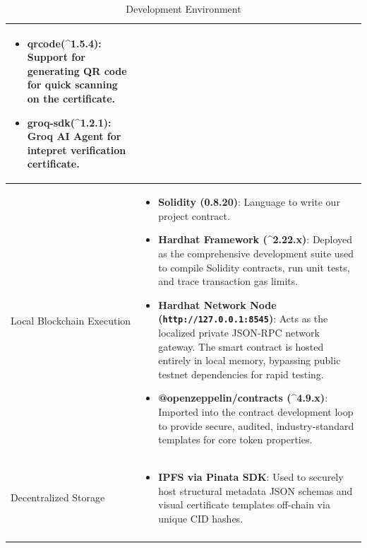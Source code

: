\begin{longtable}{|m{3.5cm}|m{10.5cm}|}
\begin{itemize}
        \item \textbf{qrcode(\^{}1.5.4)}: Support for generating QR code for quick scanning on the certificate.

        \item \textbf{groq-sdk(\^{}1.2.1)}: Groq AI Agent for intepret verification certificate.
    \end{itemize}\\
    \hline

    Local Blockchain Execution
    & \begin{itemize}
        \item \textbf{Solidity (0.8.20)}: Language to write our project contract.
    
        \item \textbf{Hardhat Framework (\^{}2.22.x)}: Deployed as the comprehensive development suite used to compile Solidity contracts, run unit tests, and trace transaction gas limits.
        
        \item \textbf{Hardhat Network Node (\texttt{http://127.0.0.1:8545})}: Acts as the localized private JSON-RPC network gateway. The smart contract is hosted entirely in local memory, bypassing public testnet dependencies for rapid testing.
        
        \item \textbf{@openzeppelin/contracts (\^{}4.9.x)}: Imported into the contract development loop to provide secure, audited, industry-standard templates for core token properties.
    \end{itemize}\\
    \hline

    Decentralized Storage
    & \begin{itemize}
        \item \textbf{IPFS via Pinata SDK}: Used to securely host structural metadata JSON schemas and visual certificate templates off-chain via unique CID hashes.
    \end{itemize}\\
    \hline
    
    \caption{Development Environment}
    \label{tab:dev_env_explain}
\end{longtable}
